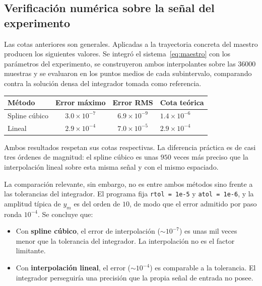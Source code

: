 \documentclass[12pt,a4paper]{article}
\begin{document}
\subsection{Verificación numérica sobre la señal del experimento}

Las cotas anteriores son generales. Aplicadas a la trayectoria concreta del maestro producen los siguientes valores. Se integró el sistema~\eqref{eq:maestro} con los parámetros del experimento, se construyeron ambos interpolantes sobre las 36000 muestras y se evaluaron en los puntos medios de cada subintervalo, comparando contra la solución densa del integrador tomada como referencia.

\begin{center}
\begin{tabularx}{0.95\textwidth}{@{}l c c X@{}}
\toprule
\textbf{Método} & \textbf{Error máximo} & \textbf{Error RMS} & \textbf{Cota teórica} \\
\midrule
Spline cúbico & $3.0 \times 10^{-7}$ & $6.9 \times 10^{-9}$ & $1.4 \times 10^{-6}$ \\
Lineal        & $2.9 \times 10^{-4}$ & $7.0 \times 10^{-5}$ & $2.9 \times 10^{-4}$ \\
\bottomrule
\end{tabularx}
\end{center}

Ambos resultados respetan sus cotas respectivas. La diferencia práctica es de casi tres órdenes de magnitud: el spline cúbico es unas $950$ veces más preciso que la interpolación lineal sobre esta misma señal y con el mismo espaciado.

La comparación relevante, sin embargo, no es entre ambos métodos sino frente a las tolerancias del integrador. El programa fija \texttt{rtol = 1e-5} y \texttt{atol = 1e-6}, y la amplitud típica de $y_m$ es del orden de $10$, de modo que el error admitido por paso ronda $10^{-4}$. Se concluye que:

\begin{itemize}[leftmargin=1.4cm]
	\item Con \textbf{spline cúbico}, el error de interpolación ($\sim 10^{-7}$) es unas mil veces menor que la tolerancia del integrador. La interpolación no es el factor limitante.
	\item Con \textbf{interpolación lineal}, el error ($\sim 10^{-4}$) es comparable a la tolerancia. El integrador perseguiría una precisión que la propia señal de entrada no posee.
\end{itemize}
\end{document}
